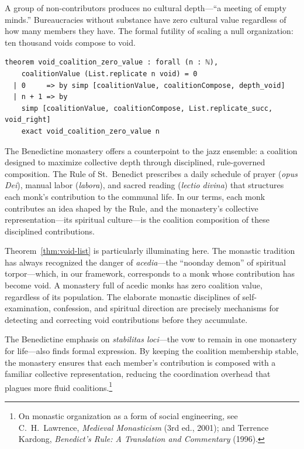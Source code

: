 A group of non-contributors produces no cultural depth---``a meeting of empty
minds.''  Bureaucracies without substance have zero cultural value regardless
of how many members they have.  The formal futility of scaling a null
organization: ten thousand voids compose to void.

\begin{lstlisting}[caption={Void coalition zero value in Lean~4}]
theorem void_coalition_zero_value : forall (n : ℕ),
    coalitionValue (List.replicate n void) = 0
  | 0     => by simp [coalitionValue, coalitionCompose, depth_void]
  | n + 1 => by
    simp [coalitionValue, coalitionCompose, List.replicate_succ, void_right]
    exact void_coalition_zero_value n
\end{lstlisting}

\begin{example}
\label{ex:monastery}
The Benedictine monastery offers a counterpoint to the jazz ensemble:
a coalition designed to maximize collective depth through disciplined,
rule-governed composition.  The Rule of St.~Benedict prescribes a daily
schedule of prayer (\textit{opus Dei}), manual labor (\textit{labora}),
and sacred reading (\textit{lectio divina}) that structures each monk's
contribution to the communal life.  In our terms, each monk contributes
an idea shaped by the Rule, and the monastery's collective
representation---its spiritual culture---is the coalition composition
of these disciplined contributions.

Theorem~\ref{thm:void-list} is particularly illuminating here.  The
monastic tradition has always recognized the danger of \emph{acedia}---the
``noonday demon'' of spiritual torpor---which, in our framework,
corresponds to a monk whose contribution has become void.  A monastery
full of acedic monks has zero coalition value, regardless of its
population.  The elaborate monastic disciplines of self-examination,
confession, and spiritual direction are precisely mechanisms for detecting
and correcting void contributions before they accumulate.

The Benedictine emphasis on \textit{stabilitas loci}---the vow to remain
in one monastery for life---also finds formal expression.  By keeping the
coalition membership stable, the monastery ensures that each member's
contribution is composed with a familiar collective representation,
reducing the coordination overhead that plagues more fluid
coalitions.\footnote{On monastic organization as a form of social
engineering, see C.~H.~Lawrence, \textit{Medieval Monasticism} (3rd ed.,
2001); and Terrence Kardong, \textit{Benedict's Rule: A Translation and
Commentary} (1996).}
\end{example}

